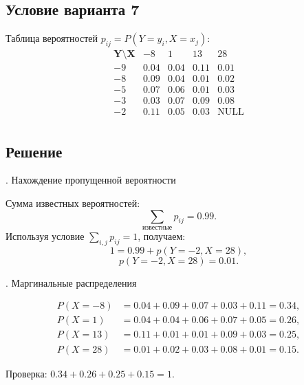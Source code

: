 \documentclass[a4paper,14pt]{extarticle}
\begin{document}
        \subsection*{Условие варианта 7}
            Таблица вероятностей $p_{ij} = P(Y=y_i, X=x_j)$:
            \[
                \begin{array}{c|cccc}
                    \mathbf{Y \setminus X} & -8 & 1 & 13 & 28 \\
                    \hline
                    -9 & 0.04 & 0.04 & 0.11 & 0.01  \\
                    -8 & 0.09 & 0.04 & 0.01 & 0.02  \\
                    -5 & 0.07 & 0.06 & 0.01 & 0.03  \\
                    -3 & 0.03 & 0.07 & 0.09 & 0.08  \\
                    -2 & 0.11 & 0.05 & 0.03 & \text{NULL}  \\
                \end{array}
            \]
        
        \subsection*{Решение}
            
            . Нахождение пропущенной вероятности
            
            Сумма известных вероятностей:
            \[
                \sum_{\text{известные}} p_{ij} = 0.99.
            \]
            Используя условие $\sum_{i,j} p_{ij} = 1$, получаем:
            \[
                1 = 0.99 + p(Y=-2, X=28),
            \]
            \[
                \boxed{p(Y=-2, X=28) = 0.01.}
            \]
            
            . Маргинальные распределения
            
            \[
                \begin{aligned}
                    P(X=-8) &= 0.04 + 0.09 + 0.07 + 0.03 + 0.11 = 0.34, \\
                    P(X=1)  &= 0.04 + 0.04 + 0.06 + 0.07 + 0.05 = 0.26, \\
                    P(X=13) &= 0.11 + 0.01 + 0.01 + 0.09 + 0.03 = 0.25, \\
                    P(X=28) &= 0.01 + 0.02 + 0.03 + 0.08 + 0.01 = 0.15.
                \end{aligned}
            \]
            
            Проверка: $0.34 + 0.26 + 0.25 + 0.15 = 1.$
            
\end{document}
